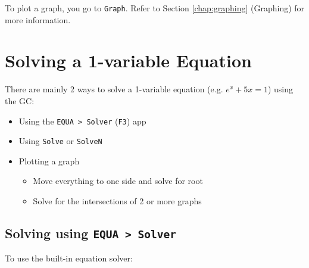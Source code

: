 \documentclass[a5paper]{memoir}
\def\code#1{\texttt{#1}}
\def\Fone{(\code{F1}) }
\def\Fthree{(\code{F3}) }
\def\Fsix{(\code{F6}) }
\begin{document}
To plot a graph, you go to \code{Graph}. Refer to Section \ref{chap:graphing} (Graphing) for more information.

\section{Solving a 1-variable Equation}
There are mainly 2 ways to solve a 1-variable equation (e.g. $e^x + 5x = 1$) using the GC:
\begin{itemize}
	\item Using the \code{EQUA > Solver} \Fthree app
	\item Using \code{Solve} or \code{SolveN}
	\item Plotting a graph
	\begin{itemize}
		\item Move everything to one side and solve for root
		\item Solve for the intersections of 2 or more graphs
	\end{itemize}
\end{itemize}

\subsection{Solving using \code{EQUA > Solver}}
To use the built-in equation solver:
\end{document}

